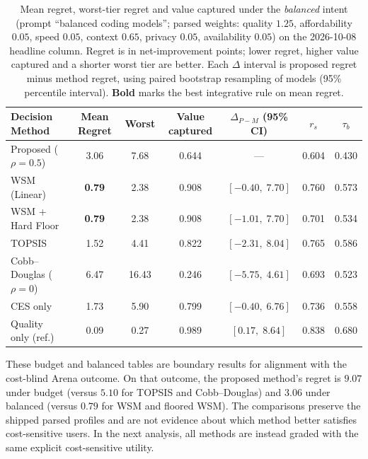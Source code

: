 \documentclass[pdflatex,sn-mathphys-num]{sn-jnl}
\theoremstyle{thmstyleone}
\theoremstyle{thmstylethree}
\begin{document}
\begin{table}[!htbp]
\caption{Mean regret, worst-tier regret and value captured under the \emph{balanced} intent (prompt ``balanced coding models''; parsed weights: quality $1.25$, affordability $0.05$, speed $0.05$, context $0.65$, privacy $0.05$, availability $0.05$) on the 2026-10-08 headline column. Regret is in net-improvement points; lower regret, higher value captured and a shorter worst tier are better. Each $\Delta$ interval is proposed regret minus method regret, using paired bootstrap resampling of models (95\% percentile interval). \textbf{Bold} marks the best integrative rule on mean regret.}\label{tab:regret_balanced}
\centering
\footnotesize
\setlength{\tabcolsep}{2pt}
\begin{tabular*}{\linewidth}{@{\extracolsep{\fill}}lcccccc@{}}
\toprule
\textbf{Decision Method} & \textbf{Mean Regret} & \textbf{Worst} & \textbf{Value captured} & \textbf{$\Delta_{P-M}$ (95\% CI)} & \textbf{$r_s$} & \textbf{$\tau_b$} \\
\midrule
Proposed ($\rho{=}0.5$)    & 3.06 & 7.68 & 0.644 & --- & 0.604 & 0.430 \\
WSM (Linear)               & \textbf{0.79} & 2.38 & 0.908 & $[-0.40,\;7.70]$ & 0.760 & 0.573 \\
WSM + Hard Floor           & \textbf{0.79} & 2.38 & 0.908 & $[-1.01,\;7.70]$ & 0.701 & 0.534 \\
TOPSIS                     & 1.52 & 4.41 & 0.822 & $[-2.31,\;8.04]$ & 0.765 & 0.586 \\
Cobb--Douglas ($\rho{=}0$) & 6.47 & 16.43 & 0.246 & $[-5.75,\;4.61]$ & 0.693 & 0.523 \\
CES only                   & 1.73 & 5.90 & 0.799 & $[-0.40,\;6.76]$ & 0.736 & 0.558 \\
\midrule
Quality only (ref.)        & 0.09 & 0.27 & 0.989 & $[0.17,\;8.64]$ & 0.838 & 0.680 \\
\bottomrule
\end{tabular*}
\end{table}

These budget and balanced tables are boundary results for alignment with the cost-blind Arena outcome. On that outcome, the proposed method's regret is $9.07$ under budget (versus $5.10$ for TOPSIS and Cobb--Douglas) and $3.06$ under balanced (versus $0.79$ for WSM and floored WSM). The comparisons preserve the shipped parsed profiles and are not evidence about which method better satisfies cost-sensitive users. In the next analysis, all methods are instead graded with the same explicit cost-sensitive utility.
\end{document}
